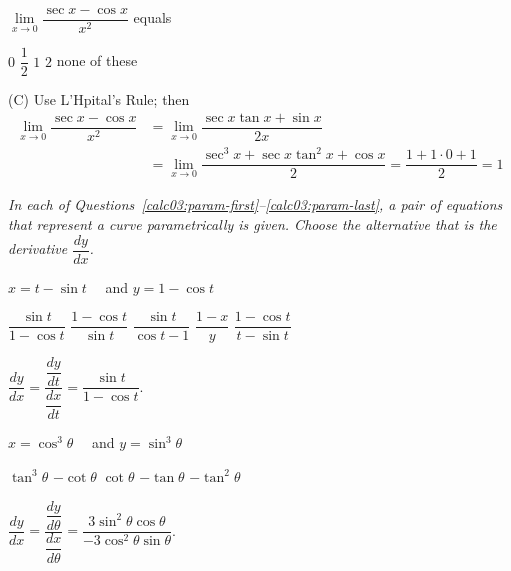 \question
$\lim\limits_{x \to 0} \dfrac{\sec x-\cos x}{x^{2}}$ equals
\begin{choices}
  \choice $0$
  \choice $\dfrac{1}{2}$
  \CorrectChoice $1$
  \choice $2$
  \choice none of these
\end{choices}
\begin{solution}
(C) Use L'Hpital's Rule; then
\[
\begin{aligned}
\lim\limits_{x \to 0} \dfrac{\sec x-\cos x}{x^{2}} & =\lim\limits_{x \to 0} \dfrac{\sec x \tan x+\sin x}{2 x} \\
& =\lim\limits_{x \to 0} \dfrac{\sec ^{3} x+\sec x \tan ^{2} x+\cos x}{2}=\dfrac{1+1 \cdot 0+1}{2}=1
\end{aligned}
\]
\end{solution}




\newpage





\begin{EnvFullwidth}
\textit{In each of Questions~\ref{calc03:param-first}--\ref{calc03:param-last}, a pair of equations that represent a curve parametrically is given. Choose the alternative that is the derivative $\dfrac{d y}{d x}$.}
\end{EnvFullwidth}

\question\label{calc03:param-first}
$x=t-\sin t \quad$ and $y=1-\cos t$
\begin{choices}
  \CorrectChoice $\dfrac{\sin t}{1-\cos t}$
  \choice $\dfrac{1-\cos t}{\sin t}$
  \choice $\dfrac{\sin t}{\cos t-1}$
  \choice $\dfrac{1-x}{y}$
  \choice $\dfrac{1-\cos t}{t-\sin t}$
\end{choices}
\begin{solution}
$\dfrac{d y}{d x}=\dfrac{\dfrac{d y}{d t}}{\dfrac{d x}{d t}}=\dfrac{\sin t}{1-\cos t}$.
\end{solution}

\question
$x=\cos ^{3} \theta \quad$ and $y=\sin ^{3} \theta$
\begin{choices}
  \choice $\tan ^{3} \theta$
  \choice $-\cot \theta$
  \choice $\cot \theta$
  \CorrectChoice $-\tan \theta$
  \choice $-\tan ^{2} \theta$
\end{choices}
\begin{solution}
$\dfrac{d y}{d x}=\dfrac{\dfrac{d y}{d \theta}}{\dfrac{d x}{d \theta}}=\dfrac{3 \sin ^{2} \theta \cos \theta}{-3 \cos ^{2} \theta \sin \theta}$.
\end{solution}

